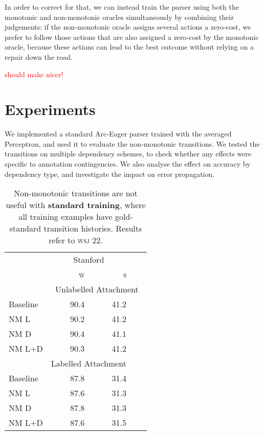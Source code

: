 \documentclass[11pt,letterpaper]{article}
\newcommand{\wsj}{\textsc{wsj}\xspace}
\newcommand{\note}[1]{\textcolor{red}{#1}}
\begin{document}
In order to correct for that, we can instead train the parser using both the
monotonic and non-monotonic oracles simultaneously by combining their
judgements: if the non-monotonic oracle assigns several actions a zero-cost,
we prefer to follow those actions that are also assigned a zero-cost by the
monotonic oracle, because these actions can lead to the best outcome without
relying on a repair down the road.

\note{should make nicer!}


\section{Experiments}

We implemented a standard Arc-Eager parser trained with the averaged Perceptron,
and used it to evaluate the non-monotonic transitions. We tested the transitions on
multiple dependency schemes, to check whether any effects were specific to annotation
contingencies. We also analyse the effect on accuracy by dependency type, and
investigate the impact on error propagation.


\begin{table}[t]

    \small
    \centering
    \begin{tabular}{l|rrrr}
        \hline
        & \multicolumn{2}{c}{Stanford} \\
        & \textsc{w}  & \textsc{s} \\
\hline \hline
        & \multicolumn{4}{c}{Unlabelled Attachment} \\
        \hline
Baseline & 90.4 & 41.2 \\
NM L & 90.2 & 41.2 \\
NM D & 90.4 & 41.1 \\
NM L+D & 90.3 & 41.2\\
\hline
            & \multicolumn{2}{c}{Labelled Attachment} \\
            \hline
Baseline & 87.8 & 31.4 \\
NM L & 87.6 & 31.3 \\
NM D & 87.8 & 31.3 \\
NM L+D & 87.6 & 31.5 \\
\hline
    \end{tabular}
    \caption{\small Non-monotonic transitions are not useful with
        \textbf{standard training},
where all training examples have gold-standard transition histories. Results refer to
\wsj 22.\label{tab:standard}}
\end{table}
\end{document}
